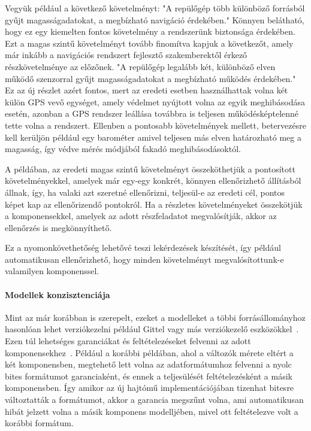         Vegyük például a következő követelményt: "A repülőgép több különböző forrásból gyűjt magasságadatokat, a megbízható navigáció érdekében."
        Könnyen belátható, hogy ez egy kiemelten fontos követelmény a rendszerünk biztonsága érdekében. Ezt a magas szintű követelményt tovább finomítva kapjuk a következőt, amely már inkább a navigációs rendszert fejlesztő szakemberektől érkező részkövetelménye az előzőnek. "A repülőgép legalább két, különböző elven működő szenzorral gyűjt magasságadatokat a megbízható működés érdekében." Ez az új részlet azért fontos, mert az eredeti esetben használhattak volna két külön GPS vevő egységet, amely védelmet nyújtott volna az egyik meghibásodása esetén, azonban a GPS rendszer leállása továbbra is teljesen működésképtelenné tette volna a rendszert. Ellenben a pontosabb követelmények mellett, betervezésre kell kerüljön például egy barométer amivel teljesen más elven határozható meg a magasság, így védve mérés módjából fakadó meghibásodásoktól.
        
        A példában, az eredeti magas szintű követelményt összeköthetjük a pontosított követelményekkel, amelyek már egy-egy konkrét, könnyen ellenőrizhető állításból állnak, így, ha valaki azt szeretné ellenőrizni, teljesül-e az eredeti cél, pontos képet kap az ellenőrizendő pontokról. Ha a részletes követelményeket összekötjük a komponensekkel, amelyek az adott részfeladatot megvalósítják, akkor az ellenőrzés is megkönnyíthető.
        
        Ez a nyomonkövethetőség lehetővé teszi lekérdezések készítését, így például automatikusan ellenőrizhető, hogy minden követelményt megvalósítottunk-e valamilyen komponenssel.

        \paragraph{Modellek konzisztenciája}
        Mint az már korábban is szerepelt, ezeket a modelleket a többi forrásállományhoz hasonlóan lehet verziókezelni például Gittel vagy más verziókezelő eszközökkel~\cite{Git2024, LieberLieber2024}.
        Ezen túl lehetséges garanciákat és feltételezéseket felvenni az adott komponensekhez~\cite{Bajaj_2022}. Például a korábbi példában, ahol a változók mérete eltért a két komponensben, megtehető lett volna az adatformátumhoz felvenni a nyolc bites formátumot garanciaként, és ennek a teljesülését feltételezésként a másik komponensben.
        Így amikor az új hajtómű implementációjában tizenhat bitesre változtatták a formátumot, akkor a garancia megszűnt volna, ami automatikusan hibát jelzett volna a másik komponens modelljében, mivel ott feltételezve volt a korábbi formátum.

